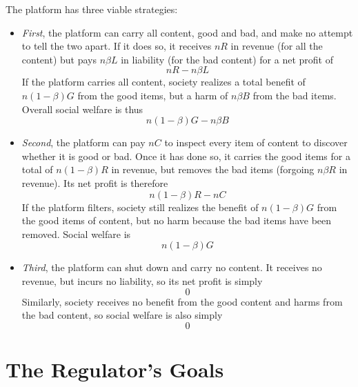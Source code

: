 The platform has three viable strategies:
\begin{itemize}

\item  \emph{First}, the platform can carry all content, good and bad, and make no attempt to tell the two apart. If it does so, it receives $nR$ in revenue (for all the content) but pays $n\beta L$ in liability (for the bad content) for a net profit of
\begin{equation}
\label{profitnofilter}
nR - n\beta L
\end{equation}
If the platform carries all content, society realizes a total benefit of $n(1-\beta)G$ from the good items, but a harm of $n\beta B$ from the bad items. Overall social welfare is thus
\begin{equation}
\label{welfarenofilter}
n(1-\beta)G - n \beta B
\end{equation}

\item \emph{Second}, the platform can pay $nC$ to inspect every item of content to discover whether it is good or bad. Once it has done so, it carries the good items for a total of $n(1-\beta)R$ in revenue, but removes the bad items (forgoing $n\beta R$ in revenue). Its net profit is therefore 
\begin{equation}
\label{profitfilter}
n(1 - \beta)R - nC    
\end{equation}
If the platform filters, society still realizes the benefit of  $n(1-\beta)G$ from the good items of content, but no harm because the bad items have been removed. Social welfare is
\begin{equation}
\label{welfarefilter}
n(1-\beta)G
\end{equation}

\item \emph{Third}, the platform can shut down and carry no content. It receives no revenue, but incurs no liability, so its net profit is simply
\begin{equation}
\label{profitshutdown}
0  
\end{equation}
Similarly, society receives no benefit from the good content and harms from the bad content, so social welfare is also simply 
\begin{equation}
\label{welfareshutdown}
0  
\end{equation}
\end{itemize}

\section{The Regulator's Goals}

